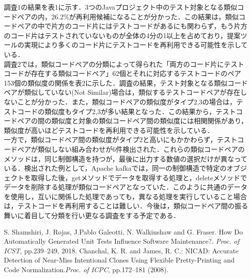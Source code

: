 \documentclass{fose2019}           %
\begin{document}
調査1の結果を表1に示す．3つのJavaプロジェクト中のテスト対象となる類似コードペアの内，26.2\%が再利用候補になることが分かった．この結果は，類似コードペアの中で片方のコード片にはテストコードがあるにも関わらず，もう片方のコード片はテストされていないものが全体の4分の1以上を占めており，提案ツールの実現により多くのコード片にテストコードを再利用できる可能性を示している．
\\\indent 調査2では，類似コードペアの分類によって得られた「両方のコード片にテストコードが存在する類似コードペア」62個とそれに対応するテストコードのペア153個の類似度の関係を表2に示した．調査の結果，テスト対象となる類似コードペアが類似していない(Not Similar)場合は，類似するテストコードペアが存在しないことが分かった．また，類似コードペアの類似度がタイプ2,3の場合は，テストコードの類似度もタイプ2,3が多い結果となった．この結果から，テストコードペアの間の類似度と対象の類似コードペア間の類似度には相関関係があり，類似度が高いほどテストコードを再利用できる可能性を示している．
\\\indent 一方で，類似コードペア間の類似度がタイプ2と高いにもかかわらず，テストコードペアが類似しない組み合わせが6件検出された．これらの類似コードペアのメソッドは，同じ制御構造を持つが，最後に出力する数値の選択だけが異なっている．検出された例として，Apache kafkaでは，同一の制御構造で特定のオブジェクトを取得した後，getメソッドでデータを取得する処理と，deleteメソッドでデータを削除する処理が類似コードペアとなっていた．このように共通のデータを使用し，互いに関係した処理であっても，異なる処理を実行していること場合は，テストコードを再利用することは難しい．今後は，類似コードペア間の振る舞いに着目して分類を行い更なる調査をする予定である．


%

\begin{thebibliography}{2}
 S. Shamshiri, J. Rojas, J.Pablo Galeotti, N. Walkinshaw and G. Fraser. How Do Automatically Generated Unit Tests Influence Software Maintenance?. {\it Proc. of ICST}, pp.239--249, 2018. 
 Chanchal, K. R. and James, R. C.: NICAD: Accurate Detection of Near-Miss Intentional Clones Using Flexible Pretty-Printing and Code Normalization.{\it Proc. of ICPC}, pp.172--181 (2008).
\end{thebibliography}
\end{document}
